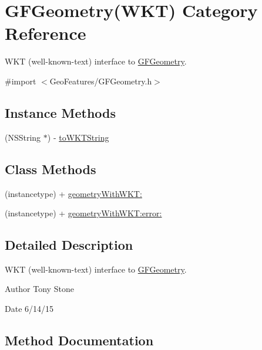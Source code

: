 \hypertarget{category_g_f_geometry_07_w_k_t_08}{}\section{G\+F\+Geometry(W\+K\+T) Category Reference}
\label{category_g_f_geometry_07_w_k_t_08}


W\+K\+T (well-\/known-\/text) interface to \hyperlink{interface_g_f_geometry}{G\+F\+Geometry}.  




{\ttfamily \#import $<$Geo\+Features/\+G\+F\+Geometry.\+h$>$}

\subsection*{Instance Methods}
\begin{DoxyCompactItemize}
\item 
(N\+S\+String $\ast$) -\/ \hyperlink{category_g_f_geometry_07_w_k_t_08_a9d257cce05d031211e2cece24b5530e4}{to\+W\+K\+T\+String}
\end{DoxyCompactItemize}
\subsection*{Class Methods}
\begin{DoxyCompactItemize}
\item 
(instancetype) + \hyperlink{category_g_f_geometry_07_w_k_t_08_a32a49e08fdbc2998735c26ddbfa88741}{geometry\+With\+W\+K\+T\+:}
\item 
(instancetype) + \hyperlink{category_g_f_geometry_07_w_k_t_08_a04922dcfc9db4543970774b0457d487b}{geometry\+With\+W\+K\+T\+:error\+:}
\end{DoxyCompactItemize}


\subsection{Detailed Description}
W\+K\+T (well-\/known-\/text) interface to \hyperlink{interface_g_f_geometry}{G\+F\+Geometry}. 

\begin{DoxyAuthor}{Author}
Tony Stone 
\end{DoxyAuthor}
\begin{DoxyDate}{Date}
6/14/15 
\end{DoxyDate}


\subsection{Method Documentation}
\hypertarget{category_g_f_geometry_07_w_k_t_08_a32a49e08fdbc2998735c26ddbfa88741}{}
